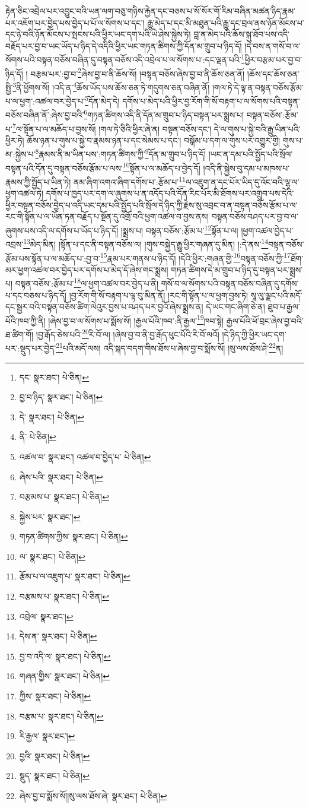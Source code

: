 རྟེན་ཅིང་འབྲེལ་པར་འབྱུང་བའི་ཡན་ལག་བཅུ་གཉིས་རྐྱེན་དང་བཅས་པ་སོ་སོར་གོ་རིམ་བཞིན་མཚན་ཉིད་རྣམ་པར་འཇོག་པར་བྱེད་པས་བྱེད་པ་པོ་ལ་སོགས་པ་དང་། རྒྱུ་མེད་པ་དང་མི་མཐུན་པའི་རྒྱུ་དང་བྲལ་ནས་ཉོན་མོངས་པ་དང་ཉེ་བའི་ཉོན་མོངས་པ་སྤངས་པའི་ཕྱིར་ཡང་དག་པའི་ཡེ་ཤེས་སྐྱེས་ཏེ། བླ་ན་མེད་པའི་ཆོས་སྐུ་ཐོབ་པས་འདི་བརྗོད་པར་བྱ་བ་ཡང་ཡོད་པ་ཉིད་དེ་འདིའི་ཕྱིར་ཡང་གཏན་ཚིགས་ཀྱི་དོན་མ་གྲུབ་པ་ཉིད་དོ། །དེ་བས་ན་གསོ་བ་ལ་སོགས་པའི་བསྟན་བཅོས་བཞིན་དུ་བསྟན་བཅོས་འདི་འབྲེལ་པ་ལ་སོགས་པ་:དང་ལྡན་པའི་\footnote{དང་  སྣར་ཐང་།  པེ་ཅིན། }ཕྱིར་བརྩམ་པར་བྱ་བ་ཉིད་དོ། །
བརྩམ་པར་:བྱ་བ་\footnote{བྱ་བ་ཉིད་  སྣར་ཐང་།  པེ་ཅིན། }ཞེས་བྱ་བ་ནི་ཆོས་སོ། །བསྟན་བཅོས་ཞེས་བྱ་བ་ནི་ཆོས་ཅན་ནོ། །ཆོས་དང་ཆོས་ཅན་སྤྱི་\footnote{དེ་  སྣར་ཐང་།  པེ་ཅིན། }ནི་ཕྱོགས་སོ། །འདི་ན་\footnote{ནི་  པེ་ཅིན། }ཆོས་ཡོད་པས་ཆོས་ཅན་ཏེ་གདུགས་ཅན་བཞིན་ནོ། །གལ་ཏེ་དེ་ལྟ་ན་བསྟན་བཅོས་རྩོམ་པ་ལ་ཕྱག་:འཚལ་བར་བྱེད་པ་\footnote{འཚལ་བ་  སྣར་ཐང་། འཚལ་བ་བྱེད་པ་  པེ་ཅིན། }དོན་མེད་དེ། དགོས་པ་མེད་པའི་ཕྱིར་བྱ་རོག་གི་སོ་བརྟག་པ་ལ་སོགས་པའི་བསྟན་བཅོས་བཞིན་ནོ་:ཞེས་བྱ་བའི་\footnote{ཞེས་པའི་  སྣར་ཐང་།  པེ་ཅིན། }གཏན་ཚིགས་འདི་ནི་དོན་མ་གྲུབ་པ་ཉིད་བསྟན་པར་སྨྲས་པ། བསྟན་བཅོས་:རྩོམ་པ་\footnote{བརྩམས་པ་  སྣར་ཐང་།  པེ་ཅིན། }ལ་སྟོན་པ་ལ་མཆོད་པ་བྱས་སོ། །གལ་ཏེ་ཅིའི་ཕྱིར་ཞེ་ན། བསྟན་བཅོས་དང་། དེ་ལ་གུས་པ་སྐྱེ་བའི་རྒྱུ་ཡིན་པའི་ཕྱིར་ཏེ། ཆོས་ཉན་པ་གུས་པ་སྐྱེ་བ་རྣམས་ཉན་པ་དང་སེམས་པ་དང་། བསྒོམ་པ་དག་ལ་གུས་པར་འགྱུར་གྱི། གུས་པ་མ་:སྐྱེས་པ་\footnote{སྐྱེས་པར་  སྣར་ཐང་། }རྣམས་ནི་མ་ཡིན་པས་:གཏན་ཚིགས་ཀྱི་\footnote{གཏན་ཚིགས་ཀྱིས་  སྣར་ཐང་།  པེ་ཅིན། }དོན་མ་གྲུབ་པ་ཉིད་དོ། །ཡང་ན་དམ་པའི་སྤྱོད་པའི་སྲོལ་བསྟན་པའི་དོན་དུ་བསྟན་བཅོས་རྩོམ་པ་ལས་\footnote{ལ་  སྣར་ཐང་།  པེ་ཅིན། }སྟོན་པ་ལ་མཆོད་པ་བྱེད་དོ། །འདི་ནི་སྐྱེས་བུ་དམ་པ་མཁས་པ་རྣམས་ཀྱི་སྤྱོད་པ་ཡིན་ཏེ། ནམ་ཞིག་འགའ་ཞིག་དགོས་པ་:རྩོམ་པ་\footnote{རྩོམ་པ་ལ་འཇུག་པ་  སྣར་ཐང་།  པེ་ཅིན། }ལ་འཇུག་ན་དང་པོར་ཡིད་དུ་འོང་བའི་ལྷ་ལ་ཕྱག་འཚལ་ཏེ། དགོས་པ་ཁྱད་པར་དག་ལ་ཞུགས་པ་ན་འདོད་པའི་དོན་རིང་པོར་མི་ཐོགས་པར་འགྲུབ་པས་དེའི་ཕྱིར་བསྟན་བཅོས་བྱེད་པ་འདི་ཡང་དམ་པའི་སྤྱོད་པའི་སྲོལ་དེ་ཉིད་ཀྱི་རྗེས་སུ་འབྲང་བ་ན་བསྟན་བཅོས་རྩོམ་པ་ལ་རང་གི་སྟོན་པ་ལ་ཡོན་ཏན་བརྗོད་པ་སྔོན་དུ་འགྲོ་བའི་ཕྱག་འཚལ་བ་བྱས་ནས། བསྟན་བཅོས་བཤད་པར་བྱ་བ་ལ་ཞུགས་པས་འདི་ལ་དགོས་པ་ཡོད་པ་ཉིད་དོ། །སྨྲས་པ། བསྟན་བཅོས་:རྩོམ་པ་\footnote{བརྩམས་པ་  སྣར་ཐང་།  པེ་ཅིན། }སྟོན་པ་ལ། །ཕྱག་འཚལ་བྱེད་པ་འབྲས་\footnote{འབྲེལ་  སྣར་ཐང་། }མེད་མིན། །སྟོན་པ་དང་ནི་བསྟན་བཅོས་ལ། །གུས་བསྐྱེད་རྒྱུ་ཕྱིར་གཞན་དུ་མིན། །:དེ་ནས་\footnote{དེས་ན་  སྣར་ཐང་།  པེ་ཅིན། }བསྟན་བཅོས་རྩོམ་པས་སྟོན་པ་ལ་མཆོད་པ་:བྱ་བ་\footnote{བྱ་བ་འདི་ལ་  སྣར་ཐང་།  པེ་ཅིན། }རྣམ་པར་གནས་པ་ཉིད་དོ། །དེའི་ཕྱིར་:གཞན་གྱི་\footnote{གཞན་གྱིས་  སྣར་ཐང་།  པེ་ཅིན། }བསྟན་བཅོས་ཀྱི་\footnote{ཀྱིས་  སྣར་ཐང་།  པེ་ཅིན། }ཐོག་མར་ཕྱག་འཚལ་བར་བྱེད་པར་དགོས་པ་མེད་དོ་ཞེས་གང་སྨྲས། གཏན་ཚིགས་དེ་མ་གྲུབ་པ་ཉིད་དུ་བསྟན་པར་སྨྲས་པ། བསྟན་བཅོས་:རྩོམ་པ་\footnote{བརྩམ་པ་  སྣར་ཐང་།  པེ་ཅིན། }ལ་ཕྱག་འཚལ་བར་བྱེད་པ་ནི། གསོ་བ་ལ་སོགས་པའི་བསྟན་བཅོས་བཞིན་དུ་དགོས་པ་དང་བཅས་པ་ཉིད་དོ། །བྱ་རོག་གི་སོ་བརྟག་པ་ལྟ་བུ་མིན་ནོ། །རང་གི་སྟོན་པ་ལ་ཕྱག་བྱས་ཏེ། སཱ་ལུ་ལྗང་པའི་མདོ་དང་སྦྱར་བའི་བསྟན་བཅོས་ཚིག་ལེའུར་བྱས་པ་བཤད་པར་བྱའོ་ཞེས་སྨྲས་ན། དེ་ཡང་གང་ཞིག་ཅེ་ན། ཐུབ་པ་རྒྱལ་པོའི་ཁབ་ཀྱི་ནི། །ཞེས་བྱ་བ་ལ་སོགས་པ་སྨོས་སོ། །རྒྱལ་པོའི་ཁབ་:ནི་རྒྱལ་\footnote{རི་རྒྱལ་  སྣར་ཐང་། }ཁབ་སྟེ། རྒྱལ་པོའི་ཕོ་བྲང་ཞེས་བྱ་བའི་ཐ་ཚིག་གོ། །བྱ་རྒོད་ཅེས་པའི་\footnote{བྱའི་  སྣར་ཐང་།  པེ་ཅིན། }རི་བོ་ལ། །ཞེས་བྱ་བ་ནི་བྱ་རྒོད་ཕུང་པོའི་རི་བོ་ལའོ། །དེ་ཉིད་ཀྱི་ཕྱིར་ཡང་དག་པར་:སྡུད་པར་བྱེད་\footnote{སྡུད་  སྣར་ཐང་།  པེ་ཅིན། }པའི་མདོ་ལས། འདི་སྐད་བདག་གིས་ཐོས་པ་ཞེས་བྱ་བ་སྨོས་སོ། །སུ་ལས་ཐོས་ཤེ་\footnote{ཞེས་བྱ་བ་སྨོས་སོ།།སུ་ལས་ཐོས་ཞེ་  སྣར་ཐང་།  པེ་ཅིན། }ན། 